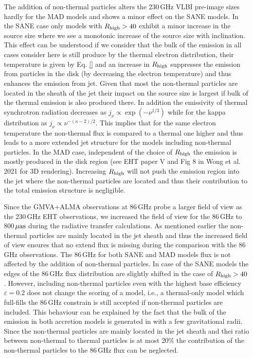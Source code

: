 The addition of non-thermal particles alters the 230\,GHz VLBI pre-image sizes hardly for the MAD models and shows a minor effect on the SANE models. In the SANE case only models with $R_\mathrm{high}>40$ exhibit a minor increase in the source size where we see a monotonic increase of the source size with inclination. This effect can be understood if we consider that the bulk of the emission in all cases consider here is still produce by the thermal electron distribution, their temperature is given by Eq. \ref{} and an increase in $R_\mathrm{high}$ suppresses the emission from particles in the disk (by decreasing the electron temperature) and thus enhances the emission from jet.
Given that most the non-thermal particles are located in the sheath of the jet their impact on the source size is largest if bulk of the thermal emission is also produced there. In addition the emissivity of thermal synchrotron radiation decreases as $j_{\nu}\propto \exp{\left(-\nu^{1/3}
\right)}$ while for the kappa distribution as $j_{\nu}\propto \nu^{-(\kappa -2)/2}$. This implies that for the same electron temperature the non-thermal flux is compared to a thermal one higher and thus leads to a more extended jet structure for the models including non-thermal particles.
\newline In the MAD case, independent of the choice of $R_\mathrm{high}$ the emission is mostly produced in the disk region (see EHT paper V and Fig 8 in Wong et al. 2021 for 3D rendering). Increasing $R_\mathrm{high}$ will not push the emission region into the jet where the non-thermal particles are located and thus their contribution to the total emission structure is negligible.


Since the GMVA+ALMA observations at 86\,GHz  probe a larger field of view as the 230\,GHz EHT observations, we increased the field of view for the 86\,GHz to 800\,$\rm{\mu as}$ during the radiative transfer calculations. As mentioned earlier the non-thermal particles are mainly located in the jet sheath and thus the increased field of view ensures that no extend flux is missing during the comparison with the 86\,GHz observations.
\newline The 86\,GHz for both SANE and MAD models flux is not affected by the addition of non-thermal particles. In case of the SANE models the edges of the 86\,GHz flux distribution are slightly shifted in the case of $R_\mathrm{high}>40$. However, including non-thermal particles even with the highest base efficiency $\varepsilon=0.2$ does not change the scoring of a model, i.e., a thermal-only model which full-fills the 86\,GHz constrain is still accepted if non-thermal particles are included. This behaviour can be explained by the fact that the bulk of the emission in both accretion models is generated in with a few gravitational radii. Since the non-thermal particles are mainly located in the jet sheath and thei ratio between non-thermal to thermal particles is at most 20\% the contribution of the non-thermal particles to the 86\,GHz flux can be neglected.

